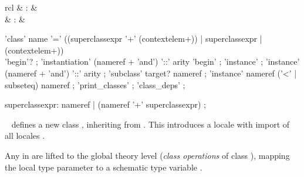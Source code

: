 \begin{isabellebody}
\begin{isamarkuptext}
\begin{matharray}{rcl}
    \hypertarget{command.class-deps}{\hyperlink{command.class-deps}{\mbox{}}} & : &  \\
    \hypertarget{method.intro-classes}{\hyperlink{method.intro-classes}{\mbox{}}} & : &  \\
  \end{matharray}

  \begin{rail}
    'class' name '=' ((superclassexpr '+' (contextelem+)) | superclassexpr | (contextelem+)) \\
      'begin'?
    ;
    'instantiation' (nameref + 'and') '::' arity 'begin'
    ;
    'instance'
    ;
    'instance' (nameref + 'and') '::' arity
    ;
    'subclass' target? nameref
    ;
    'instance' nameref ('<' | subseteq) nameref
    ;
    'print_classes'
    ;
    'class_deps'
    ;

    superclassexpr: nameref | (nameref '+' superclassexpr)
    ;
  \end{rail}

  \begin{description}

  \item \hyperlink{command.class}{\mbox{}}~ defines
  a new class , inheriting from .  This
  introduces a locale  with import of all locales .

  Any \hyperlink{element.fixes}{\mbox{}} in  are lifted to the global
  theory level (\emph{class operations}  of class ), mapping the local type parameter
   to a schematic type variable .


\end{description}
\end{isamarkuptext}
\end{isabellebody}
